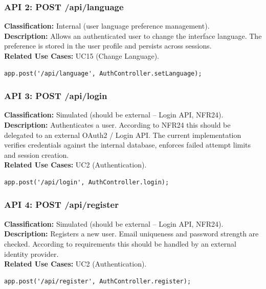 \documentclass{article}
\begin{document}
\subsubsection*{API 2: POST /api/language}
\textbf{Classification:} Internal (user language preference management).\\
\textbf{Description:} Allows an authenticated user to change the interface language.
The preference is stored in the user profile and persists across sessions.\\
\textbf{Related Use Cases:} UC15 (Change Language).
\begin{verbatim}
app.post('/api/language', AuthController.setLanguage);
\end{verbatim}

\subsubsection*{API 3: POST /api/login}
\textbf{Classification:} Simulated (should be external – Login API, NFR24).\\
\textbf{Description:} Authenticates a user. According to NFR24 this should be delegated
to an external OAuth2 / Login API. The current implementation verifies credentials
against the internal database, enforces failed attempt limits and session creation.\\
\textbf{Related Use Cases:} UC2 (Authentication).
\begin{verbatim}
app.post('/api/login', AuthController.login);
\end{verbatim}

\subsubsection*{API 4: POST /api/register}
\textbf{Classification:} Simulated (should be external – Login API, NFR24).\\
\textbf{Description:} Registers a new user. Email uniqueness and password strength
are checked. According to requirements this should be handled by an external
identity provider.\\
\textbf{Related Use Cases:} UC2 (Authentication).
\begin{verbatim}
app.post('/api/register', AuthController.register);
\end{verbatim}
\end{document}
